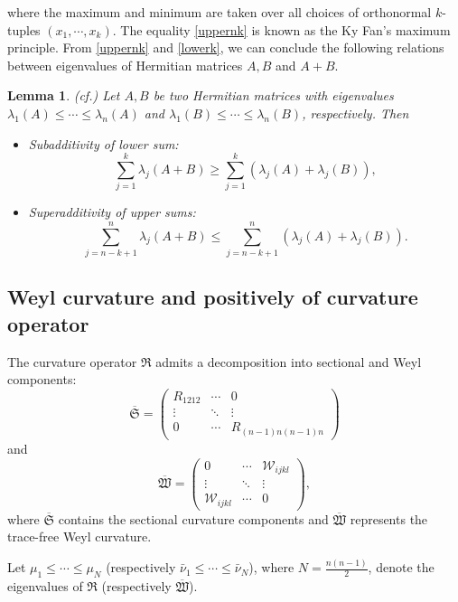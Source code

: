 \documentclass[12pt, twoside]{article}
\newtheorem{lemma}[theorem]{Lemma}
\theoremstyle{definition}
\numberwithin{equation}{section}
\def \la {\lambda}
\begin{document}
where the maximum and minimum are taken over all choices of orthonormal $k$-tuples $(x_{1},\cdots,x_{k})$. The equality \eqref{uppernk} is known as the Ky Fan's maximum principle. From \eqref{uppernk} and \eqref{lowerk}, we can conclude the following relations between eigenvalues of Hermitian matrices $A,B$ and $A+B$.
\begin{lemma}\label{L1}(cf.\cite[Page 35]{Bha97})
Let $A,B$ be two Hermitian matrices with eigenvalues $\la_{1}(A)\leq\cdots\leq\la_{n}(A)$ and $\la_{1}(B)\leq\cdots\leq\la_{n}(B)$, respectively. Then
\begin{itemize}
	\item[(a)]Subadditivity of lower sum:
$$\sum_{j=1}^{k}\la_{j}(A+B)\geq\sum_{j=1}^{k}(\la_{j}(A)+\la_{j}(B)),$$
\item[(b)]Superadditivity of upper sums:
$$\sum_{j=n-k+1}^{n}\la_{j}(A+B)\leq\sum_{j=n-k+1}^{n}(\la_{j}(A)+\la_{j}(B)).$$
\end{itemize}
\end{lemma}

\subsection{Weyl curvature and positively of curvature operator}
The curvature operator $\mathfrak{R}$ admits a  decomposition into sectional and Weyl components:
$$\overline{\mathfrak{S}}=\left(\begin{array}{ccc}R_{1212} & \cdots & 0 \\ \vdots & \ddots & \vdots \\0 & \cdots & R_{(n-1)n(n-1)n}\end{array}\right)$$
and
$$\overline{\mathfrak{W}}=\left(\begin{array}{ccc}0 &\cdots  & \mathcal{W}_{ijkl} \\ \vdots &\ddots & \vdots \\ \mathcal{W}_{ijkl}  & \cdots & 0\end{array}\right),$$
where $\overline{\mathfrak{S}}$ contains the sectional curvature components and $\overline{\mathfrak{W}}$ represents the trace-free Weyl curvature.


Let $\mu_1 \leq \cdots \leq \mu_N$ (respectively $\bar{\nu}_1 \leq \cdots \leq \bar{\nu}_N$), where $N = \frac{n(n-1)}{2}$, denote the eigenvalues of $\mathfrak{R}$ (respectively $\overline{\mathfrak{W}}$).
\end{document}
